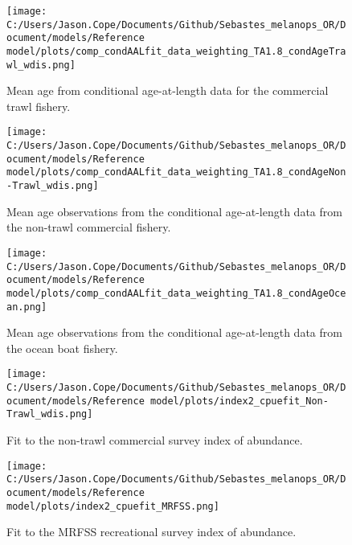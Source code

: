 \documentclass[11pt,
  letterpaper,
]{article}
\begin{document}
\begin{figure}
{\centering
\texttt{[image: C:/Users/Jason.Cope/Documents/Github/Sebastes\_melanops\_OR/Document/models/Reference model/plots/comp\_condAALfit\_data\_weighting\_TA1.8\_condAgeTrawl\_wdis.png]}
}
\caption{Mean age from conditional age-at-length data for the commercial trawl fishery.\label{fig:trawl-mean-caal}}
\end{figure}

\newpage

\begin{figure}
{\centering
\texttt{[image: C:/Users/Jason.Cope/Documents/Github/Sebastes\_melanops\_OR/Document/models/Reference model/plots/comp\_condAALfit\_data\_weighting\_TA1.8\_condAgeNon-Trawl\_wdis.png]}
}
\caption{Mean age observations from the conditional age-at-length data from the non-trawl commercial fishery.\label{fig:nontrawl-mean-caal}}
\end{figure}

\newpage

\begin{figure}
{\centering
\texttt{[image: C:/Users/Jason.Cope/Documents/Github/Sebastes\_melanops\_OR/Document/models/Reference model/plots/comp\_condAALfit\_data\_weighting\_TA1.8\_condAgeOcean.png]}
}
\caption{Mean age observations from the conditional age-at-length data from the ocean boat fishery.\label{fig:ocean-mean-caal}}
\end{figure}

\newpage

\begin{figure}
{\centering
\texttt{[image: C:/Users/Jason.Cope/Documents/Github/Sebastes\_melanops\_OR/Document/models/Reference model/plots/index2\_cpuefit\_Non-Trawl\_wdis.png]}
}
\caption{Fit to the non-trawl commercial survey index of abundance.\label{fig:nontrawl-index-fit}}
\end{figure}

\newpage

\begin{figure}
{\centering
\texttt{[image: C:/Users/Jason.Cope/Documents/Github/Sebastes\_melanops\_OR/Document/models/Reference model/plots/index2\_cpuefit\_MRFSS.png]}
}
\caption{Fit to the MRFSS recreational survey index of abundance.\label{fig:mrfss-index-fit}}
\end{figure}
\end{document}
